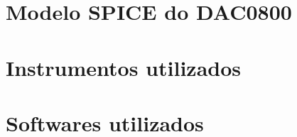 \chapter{Modelo SPICE do DAC0800}\label{ap:dac0800}

\chapter{Instrumentos utilizados}\label{ap:instrumentos}

\chapter{Softwares utilizados}\label{ap:softwares}


%



